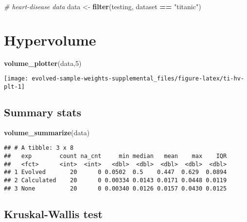 \documentclass[
]{book}
\newenvironment{Shaded}{\begin{snugshade}}{\end{snugshade}}
\newcommand{\CommentTok}[1]{\textcolor[rgb]{0.56,0.35,0.01}{\textit{#1}}}
\newcommand{\DecValTok}[1]{\textcolor[rgb]{0.00,0.00,0.81}{#1}}
\newcommand{\FunctionTok}[1]{\textcolor[rgb]{0.13,0.29,0.53}{\textbf{#1}}}
\newcommand{\NormalTok}[1]{#1}
\newcommand{\OtherTok}[1]{\textcolor[rgb]{0.56,0.35,0.01}{#1}}
\newcommand{\SpecialCharTok}[1]{\textcolor[rgb]{0.81,0.36,0.00}{\textbf{#1}}}
\newcommand{\StringTok}[1]{\textcolor[rgb]{0.31,0.60,0.02}{#1}}
\begin{document}
\begin{Shaded}
\begin{Highlighting}[]
\CommentTok{\# heart{-}disease data}
\NormalTok{data }\OtherTok{\textless{}{-}} \FunctionTok{filter}\NormalTok{(testing, dataset }\SpecialCharTok{==} \StringTok{"titanic"}\NormalTok{)}
\end{Highlighting}
\end{Shaded}

\hypertarget{hypervolume-4}{%
\section{Hypervolume}\label{hypervolume-4}}

\begin{Shaded}
\begin{Highlighting}[]
\FunctionTok{volume\_plotter}\NormalTok{(data,}\DecValTok{5}\NormalTok{)}
\end{Highlighting}
\end{Shaded}

\texttt{[image: evolved-sample-weights-supplemental\_files/figure-latex/ti-hv-plt-1]}

\hypertarget{summary-stats-4}{%
\subsection{Summary stats}\label{summary-stats-4}}

\begin{Shaded}
\begin{Highlighting}[]
\FunctionTok{volume\_summarize}\NormalTok{(data)}
\end{Highlighting}
\end{Shaded}

\begin{verbatim}
## # A tibble: 3 x 8
##   exp        count na_cnt     min median   mean    max    IQR
##   <fct>      <int>  <int>   <dbl>  <dbl>  <dbl>  <dbl>  <dbl>
## 1 Evolved       20      0 0.0502  0.5    0.447  0.629  0.0894
## 2 Calculated    20      0 0.00334 0.0143 0.0171 0.0448 0.0119
## 3 None          20      0 0.00340 0.0126 0.0157 0.0430 0.0125
\end{verbatim}

\hypertarget{kruskal-wallis-test-4}{%
\subsection{Kruskal-Wallis test}\label{kruskal-wallis-test-4}}
\end{document}
